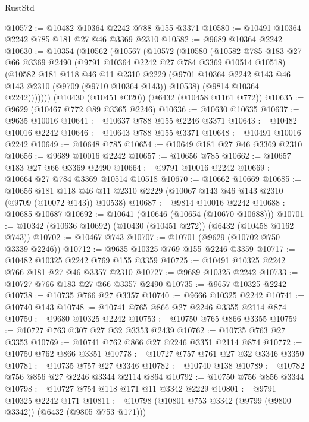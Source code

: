 \begin{lexlean}{RustStd}
\begin{coremodule}
@10572 := @10482 @10364 @2242 @788 @155 @3371
@10580 := @10491 @10364 @2242 @785 @181 @27 @46 @3369 @2310
@10582 := @9689 @10364 @2242
@10630 := @10354
    (@10562
      (@10567
        (@10572
          (@10580
            (@10582
              @785
              @183
              @27
              @66
              @3369
              @2490
              (@9791 @10364 @2242 @27 @784 @3369 @10514 @10518)
              (@10582
                @181
                @118
                @46
                @11
                @2310
                @2229
                (@9701 @10364 @2242 @143 @46 @143 @2310 (@9709 (@9710 @10364 @143)) @10538)
                (@9814 @10364 @2242)))))))
    (@10430 (@10451 @320))
    (@6432 (@10458 @1161 @772))
@10635 := @9629 (@10467 @772 @89 @3365 @2246)
@10636 := @10630 @10635
@10637 := @9635 @10016
@10641 := @10637 @788 @155 @2246 @3371
@10643 := @10482 @10016 @2242
@10646 := @10643 @788 @155 @3371
@10648 := @10491 @10016 @2242
@10649 := @10648 @785
@10654 := @10649 @181 @27 @46 @3369 @2310
@10656 := @9689 @10016 @2242
@10657 := @10656 @785
@10662 := @10657 @183 @27 @66 @3369 @2490
@10664 := @9791 @10016 @2242
@10669 := @10664 @27 @784 @3369 @10514 @10518
@10670 := @10662 @10669
@10685 := @10656
    @181
    @118
    @46
    @11
    @2310
    @2229
    (@10067 @143 @46 @143 @2310 (@9709 (@10072 @143)) @10538)
@10687 := @9814 @10016 @2242
@10688 := @10685 @10687
@10692 := @10641 (@10646 (@10654 (@10670 @10688)))
@10701 := @10342 (@10636 @10692) (@10430 (@10451 @272)) (@6432 (@10458 @1162 @743))
@10702 := @10467 @743
@10707 := @10701 (@9629 (@10702 @750 @3339 @2246))
@10712 := @9635 @10325 @769 @155 @2246 @3359
@10717 := @10482 @10325 @2242 @769 @155 @3359
@10725 := @10491 @10325 @2242 @766 @181 @27 @46 @3357 @2310
@10727 := @9689 @10325 @2242
@10733 := @10727 @766 @183 @27 @66 @3357 @2490
@10735 := @9657 @10325 @2242
@10738 := @10735 @766 @27 @3357
@10740 := @9666 @10325 @2242
@10741 := @10740 @143
@10748 := @10741 @765 @866 @27 @2246 @3355 @2114 @874
@10750 := @9680 @10325 @2242
@10753 := @10750 @765 @866 @3355
@10759 := @10727 @763 @307 @27 @32 @3353 @2439
@10762 := @10735 @763 @27 @3353
@10769 := @10741 @762 @866 @27 @2246 @3351 @2114 @874
@10772 := @10750 @762 @866 @3351
@10778 := @10727 @757 @761 @27 @32 @3346 @3350
@10781 := @10735 @757 @27 @3346
@10782 := @10740 @138
@10789 := @10782 @756 @856 @27 @2246 @3344 @2114 @864
@10792 := @10750 @756 @856 @3344
@10798 := @10727 @754 @118 @171 @11 @3342 @2229
@10801 := @9791 @10325 @2242 @171
@10811 := @10798 (@10801 @753 @3342 (@9799 (@9800 @3342)) (@6432 (@9805 @753 @171)))

\end{coremodule}
\end{lexlean}
